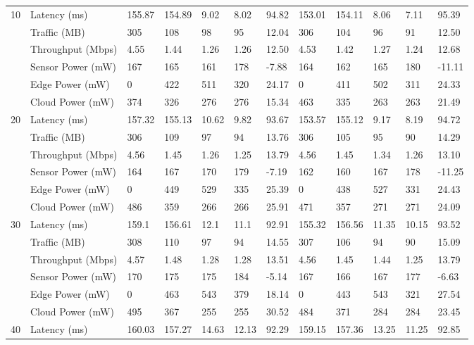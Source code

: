 \documentclass[11pt]{article}
\begin{document}
\begin{landscape}
\begin{table}[t]
{\begin{tabular}{llllllllllll}
					\multirow{6}{*}{10} & Latency (ms) & 155.87 & 154.89 & 9.02 & 8.02 & 94.82 & 153.01 & 154.11 & 8.06 & 7.11 & 95.39 \\
					& Traffic (MB) & 305 & 108 & 98 & 95 & 12.04 & 306 & 104 & 96 & 91 & 12.50 \\
					& Throughput (Mbps)   & 4.55 & 1.44 & 1.26 & 1.26 & 12.50 & 4.53 & 1.42 & 1.27 & 1.24 & 12.68 \\
					& Sensor Power (mW) & 167 & 165 & 161 & 178 & -7.88 & 164 & 162 & 165 & 180 & -11.11 \\
					& Edge Power (mW) & 0 & 422 & 511 & 320 & 24.17 & 0 & 411 & 502 & 311 & 24.33 \\
					& Cloud Power (mW) & 374 & 326 & 276 & 276 & 15.34 & 463 & 335 & 263 & 263 & 21.49 \\
					\midrule
					\multirow{6}{*}{20} & Latency (ms) & 157.32 & 155.13 & 10.62 & 9.82 & 93.67 & 153.57 & 155.12 & 9.17 & 8.19 & 94.72 \\
					& Traffic (MB) & 306 & 109 & 97 & 94 & 13.76 & 306 & 105 & 95 & 90 & 14.29 \\
					& Throughput (Mbps)  & 4.56 & 1.45 & 1.26 & 1.25 & 13.79 & 4.56 & 1.45 & 1.34 & 1.26 & 13.10 \\
					& Sensor Power (mW) & 164 & 167 & 170 & 179 & -7.19 & 162 & 160 & 167 & 178 & -11.25 \\
					& Edge Power (mW) & 0 & 449 & 529 & 335 & 25.39 & 0 & 438 & 527 & 331 & 24.43 \\
					& Cloud Power (mW) & 486 & 359 & 266 & 266 & 25.91 & 471 & 357 & 271 & 271 & 24.09 \\
					\midrule
					\multirow{6}{*}{30} & Latency (ms) & 159.1 & 156.61 & 12.1 & 11.1 & 92.91 & 155.32 & 156.56 & 11.35 & 10.15 & 93.52 \\
					& Traffic (MB) & 308 & 110 & 97 & 94 & 14.55 & 307 & 106 & 94 & 90 & 15.09 \\
					& Throughput (Mbps)  & 4.57 & 1.48 & 1.28 & 1.28 & 13.51 & 4.56 & 1.45 & 1.44 & 1.25 & 13.79 \\
					& Sensor Power (mW) & 170 & 175 & 175 & 184 & -5.14 & 167 & 166 & 167 & 177 & -6.63 \\
					& Edge Power (mW) & 0 & 463 & 543 & 379 & 18.14 & 0 & 443 & 543 & 321 & 27.54 \\
					& Cloud Power (mW) & 495 & 367 & 255 & 255 & 30.52 & 484 & 371 & 284 & 284 & 23.45 \\
					\midrule
					\multirow{6}{*}{40} & Latency (ms) & 160.03 & 157.27 & 14.63 & 12.13 & 92.29 & 159.15 & 157.36 & 13.25 & 11.25 & 92.85 \\

\end{tabular}}
\end{table}
\end{landscape}
\end{document}
